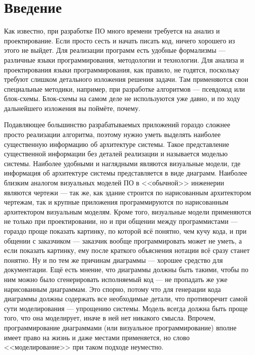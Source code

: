 \documentclass{../../text-style}
\begin{document}
\maketitle
\thispagestyle{empty}

\section{Введение}

Как известно, при разработке ПО много времени требуется на анализ и проектирование. Если просто сесть и начать писать код, ничего хорошего из этого не выйдет. Для реализации программ есть удобные формализмы --- различные языки программирования, методологии и технологии. Для анализа и проектирования языки программирования, как правило, не годятся, поскольку требуют слишком детального изложения решения задачи. Там применяются свои специальные методики, например, при разработке алгоритмов --- псевдокод или блок-схемы. Блок-схемы на самом деле не используются уже давно, и по ходу дальнейшего изложения вы поймёте, почему.

Подавляющее большинство разрабатываемых приложений гораздо сложнее просто реализации алгоритма, поэтому нужно уметь выделять наиболее существенную информацию об архитектуре системы. Такое представление существенной информации без деталей реализации и называется моделью системы. Наиболее удобными и наглядными являются визуальные модели, где информация об архитектуре системы представляется в виде диаграмм. Наиболее близким аналогом визуальных моделей ПО в <<обычной>> инженерии являются чертежи --- так же, как здание строится по нарисованным архитектором чертежам, так и крупные приложения программируются по нарисованным архитектором визуальным моделям. Кроме того, визуальные модели применяются не только при проектировании, но и при общении между программистами --- гораздо проще показать картинку, по которой всё понятно, чем кучу кода, и при общении с заказчиком --- заказчик вообще программировать может не уметь, а если показать картинку, ему после краткого объяснения нотации всё сразу станет понятно. Ну и по тем же причинам диаграммы --- хорошее средство для документации. Ещё есть мнение, что диаграммы должны быть такими, чтобы по ним можно было сгенерировать исполняемый код --- не пропадать же уже нарисованным диаграммам. Это спорно, потому что для генерации кода диаграммы должны содержать все необходимые детали, что противоречит самой сути моделирования --- упрощению системы. Модель всегда должна быть проще того, что она моделирует, иначе в ней нет никакого смысла. Впрочем, программирование диаграммами (или визуальное программирование) вполне имеет право на жизнь и даже местами применяется, но слово <<моделирование>> при таком подходе неуместно.
\end{document}
